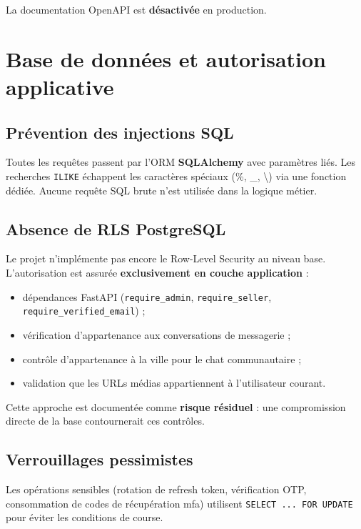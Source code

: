 La documentation OpenAPI est \textbf{désactivée} en production.


\section{Base de données et autorisation applicative}

\subsection{Prévention des injections SQL}

Toutes les requêtes passent par l'ORM \textbf{SQLAlchemy} avec paramètres liés. Les recherches \texttt{ILIKE} échappent les caractères spéciaux (\%, \_, \textbackslash) via une fonction dédiée. Aucune requête SQL brute n'est utilisée dans la logique métier.

\subsection{Absence de RLS PostgreSQL}

Le projet n'implémente pas encore le Row-Level Security au niveau base. L'autorisation est assurée \textbf{exclusivement en couche application} :
\begin{itemize}
  \item dépendances FastAPI (\texttt{require\_admin}, \texttt{require\_seller}, \texttt{require\_verified\_email}) ;
  \item vérification d'appartenance aux conversations de messagerie ;
  \item contrôle d'appartenance à la ville pour le chat communautaire ;
  \item validation que les URLs médias appartiennent à l'utilisateur courant.
\end{itemize}

Cette approche est documentée comme \textbf{risque résiduel} : une compromission directe de la base contournerait ces contrôles.

\subsection{Verrouillages pessimistes}

Les opérations sensibles (rotation de refresh token, vérification OTP, consommation de codes de récupération \gls{mfa}) utilisent \texttt{SELECT ... FOR UPDATE} pour éviter les conditions de course.

